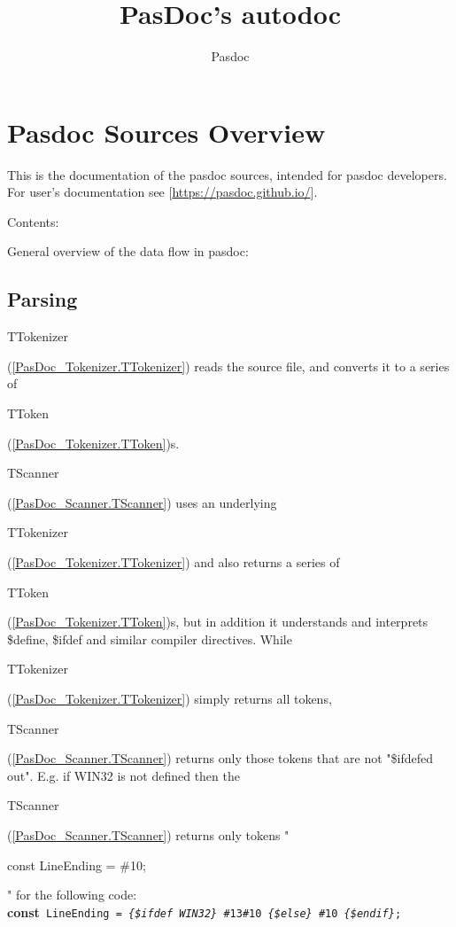 \documentclass{report}
\begin{document}
\title{PasDoc's autodoc}
\author{Pasdoc}
\maketitle
\newpage
\label{toc}\tableofcontents
\newpage
\newlength{\tmplength}
\chapter{Pasdoc Sources Overview}
\label{introduction}
 

This is the documentation of the pasdoc sources, intended for pasdoc developers. For user's documentation see [\href{https://pasdoc.github.io/}{https://pasdoc.github.io/}].

Contents: 

General overview of the data flow in pasdoc:

\label{SecParsing}
\section{Parsing}


\begin{ttfamily}TTokenizer\end{ttfamily}(\ref{PasDoc_Tokenizer.TTokenizer}) reads the source file, and converts it to a series of \begin{ttfamily}TToken\end{ttfamily}(\ref{PasDoc_Tokenizer.TToken})s.

\begin{ttfamily}TScanner\end{ttfamily}(\ref{PasDoc_Scanner.TScanner}) uses an underlying \begin{ttfamily}TTokenizer\end{ttfamily}(\ref{PasDoc_Tokenizer.TTokenizer}) and also returns a series of \begin{ttfamily}TToken\end{ttfamily}(\ref{PasDoc_Tokenizer.TToken})s, but in addition it understands and interprets {\$}define, {\$}ifdef and similar compiler directives. While \begin{ttfamily}TTokenizer\end{ttfamily}(\ref{PasDoc_Tokenizer.TTokenizer}) simply returns all tokens, \begin{ttfamily}TScanner\end{ttfamily}(\ref{PasDoc_Scanner.TScanner}) returns only those tokens that are not "{\$}ifdefed out". E.g. if WIN32 is not defined then the \begin{ttfamily}TScanner\end{ttfamily}(\ref{PasDoc_Scanner.TScanner}) returns only tokens "\begin{ttfamily}const LineEnding = {\#}10;\end{ttfamily}" for the following code: \texttt{}\textbf{const}\texttt{~LineEnding~=~\textit{{\{}{\$}ifdef~WIN32{\}}}~{\#}13{\#}10~\textit{{\{}{\$}else{\}}}~{\#}10~\textit{{\{}{\$}endif{\}}};\\
}
\end{document}
